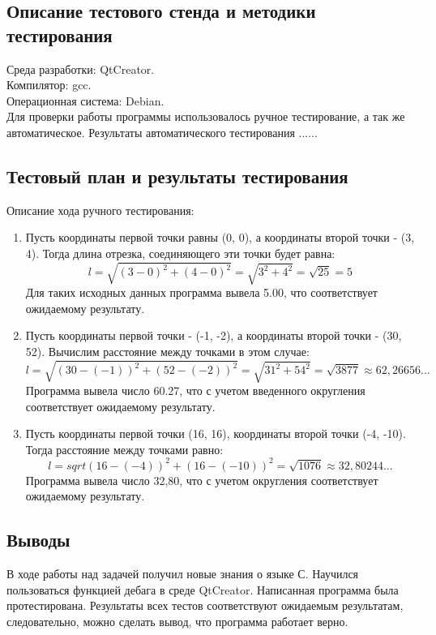 \documentclass[12pt,a4paper]{report}
\begin{document}
\subsection{Описание тестового стенда и методики тестирования}
Среда разработки: QtCreator.\\
Компилятор: gcc. \\
Операционная система: Debian. \\
Для проверки работы программы использовалось ручное тестирование, а так же автоматическое. Результаты автоматического тестирования ......
\subsection{Тестовый план и результаты тестирования}
Описание хода ручного тестирования:
\begin{enumerate}
\item
Пусть координаты первой точки равны (0, 0), а координаты второй точки - (3, 4). Тогда длина отрезка, соединяющего эти точки будет равна: 
\begin{equation}
l = \sqrt{(3 - 0) ^ 2 + (4 - 0) ^ 2} = \sqrt{3 ^ 2 + 4 ^ 2} = \sqrt{25} = 5
\end{equation}
Для таких исходных данных программа вывела 5.00, что соответствует ожидаемому результату.
\item 
Пусть координаты первой точки - (-1, -2), а координаты второй точки - (30, 52). Вычислим расстояние между точками в этом случае:
\begin{equation}
l = \sqrt{(30 - (-1))^2 + (52 - (-2))^2} = \sqrt{31^2 + 54^2} = \sqrt{3877} \approx 62,26656...
\end{equation}
Программа вывела число 60.27, что с учетом введенного округления соответствует ожидаемому результату.
\item
Пусть координаты первой точки (16, 16), координаты второй точки (-4, -10). Тогда расстояние между точками равно:
\begin{equation}
l = sqrt{(16 - (-4))^2 + (16 - (-10))^2} = \sqrt{1076} \approx 32,80244...
\end{equation}
Программа вывела число 32,80, что с учетом округления соответствует ожидаемому результату. 
\end{enumerate} 
\subsection{Выводы}
В ходе работы над задачей получил новые знания о языке С. Научился пользоваться функцией дебага в среде QtCreator. Написанная программа была протестирована. Результаты всех тестов соответствуют ожидаемым результатам, следовательно, можно сделать вывод, что программа работает верно. 
\end{document}
